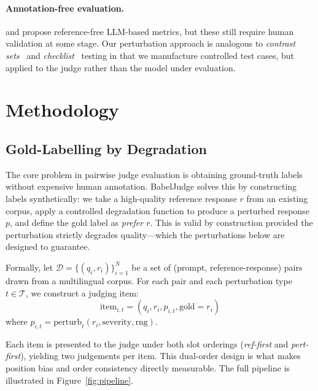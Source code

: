 \documentclass[11pt]{article}
\begin{document}
\paragraph{Annotation-free evaluation.}
\citet{guo2023evaluating} and \citet{fu2023gptscore} propose reference-free LLM-based metrics, but these still require human validation at some stage. Our perturbation approach is analogous to \emph{contrast sets}~\cite{gardner2020evaluating} and \emph{checklist}~\cite{ribeiro2020beyond} testing in that we manufacture controlled test cases, but applied to the judge rather than the model under evaluation.

\section{Methodology}
\label{sec:method}

\subsection{Gold-Labelling by Degradation}
\label{sec:gold}

The core problem in pairwise judge evaluation is obtaining ground-truth labels without expensive human annotation. BabelJudge solves this by constructing labels synthetically: we take a high-quality reference response $r$ from an existing corpus, apply a controlled degradation function to produce a perturbed response $p$, and define the gold label as \textit{prefer $r$}. This is valid by construction provided the perturbation strictly degrades quality—which the perturbations below are designed to guarantee.

Formally, let $\mathcal{D} = \{(q_i, r_i)\}_{i=1}^{N}$ be a set of (prompt, reference-response) pairs drawn from a multilingual corpus. For each pair and each perturbation type $t \in \mathcal{T}$, we construct a judging item:
\[
\text{item}_{i,t} = (q_i, r_i, p_{i,t}, \text{gold}=r_i)
\]
where $p_{i,t} = \text{perturb}_t(r_i, \text{severity}, \text{rng})$.

Each item is presented to the judge under both slot orderings (\textit{ref-first} and \textit{pert-first}), yielding two judgements per item. This dual-order design is what makes position bias and order consistency directly measurable. The full pipeline is illustrated in Figure~\ref{fig:pipeline}.
\end{document}
